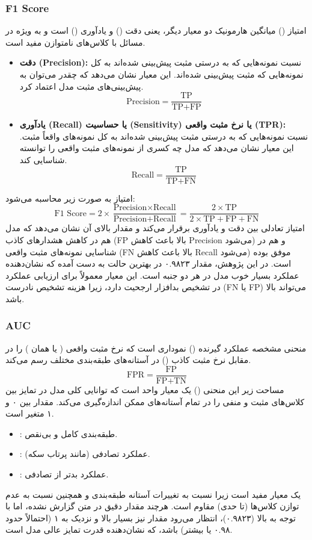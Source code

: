 \subsubsection{F1 Score}
امتیاز  () میانگین هارمونیک دو معیار دیگر، یعنی دقت () و یادآوری () است و به ویژه در مسائل با کلاس‌های نامتوازن مفید است.
\begin{itemize}
    \item \textbf{دقت (Precision):} نسبت نمونه‌هایی که به درستی مثبت پیش‌بینی شده‌اند به کل نمونه‌هایی که مثبت پیش‌بینی شده‌اند. این معیار نشان می‌دهد که چقدر می‌توان به پیش‌بینی‌های مثبت مدل اعتماد کرد.
    \[ \text{Precision} = \frac{\text{TP}}{\text{TP} + \text{FP}} \]
    \item \textbf{یادآوری (Recall) یا حساسیت (Sensitivity) یا نرخ مثبت واقعی (TPR):} نسبت نمونه‌هایی که به درستی مثبت پیش‌بینی شده‌اند به کل نمونه‌های واقعاً مثبت. این معیار نشان می‌دهد که مدل چه کسری از نمونه‌های مثبت واقعی را توانسته شناسایی کند.
    \[ \text{Recall} = \frac{\text{TP}}{\text{TP} + \text{FN}} \]
\end{itemize}
امتیاز  به صورت زیر محاسبه می‌شود:
\[ \text{F1 Score} = 2 \times \frac{\text{Precision} \times \text{Recall}}{\text{Precision} + \text{Recall}} = \frac{2 \times \text{TP}}{2 \times \text{TP} + \text{FP} + \text{FN}} \]
امتیاز  تعادلی بین دقت و یادآوری برقرار می‌کند و مقدار بالای آن نشان می‌دهد که مدل هم در کاهش هشدارهای کاذب (FP بالا باعث کاهش Precision می‌شود) و هم در شناسایی نمونه‌های مثبت واقعی (FN بالا باعث کاهش Recall می‌شود) موفق بوده است. در این پژوهش، مقدار  ۰.۹۸۲۳ در بهترین حالت به دست آمده که نشان‌دهنده عملکرد بسیار خوب مدل در هر دو جنبه است. این معیار معمولاً برای ارزیابی عملکرد در تشخیص بدافزار ارجحیت دارد، زیرا هزینه تشخیص نادرست (FN یا FP) می‌تواند بالا باشد.

\subsubsection{AUC }
منحنی مشخصه عملکرد گیرنده () نموداری است که نرخ مثبت واقعی ( یا همان ) را در مقابل نرخ مثبت کاذب () در آستانه‌های طبقه‌بندی مختلف رسم می‌کند.
\[ \text{FPR} = \frac{\text{FP}}{\text{FP} + \text{TN}} \]
مساحت زیر این منحنی () یک معیار واحد است که توانایی کلی مدل در تمایز بین کلاس‌های مثبت و منفی را در تمام آستانه‌های ممکن اندازه‌گیری می‌کند. مقدار  بین ۰ و ۱ متغیر است.
\begin{itemize}
    \item {}: طبقه‌بندی کامل و بی‌نقص.
    \item {}: عملکرد تصادفی (مانند پرتاب سکه).
    \item {}: عملکرد بدتر از تصادفی.
\end{itemize}
 یک معیار مفید است زیرا نسبت به تغییرات آستانه طبقه‌بندی و همچنین نسبت به عدم توازن کلاس‌ها (تا حدی) مقاوم است. هرچند مقدار دقیق  در متن گزارش نشده، اما با توجه به  بالا (۰.۹۸۲۳)، انتظار می‌رود مقدار  نیز بسیار بالا و نزدیک به ۱ (احتمالاً حدود ۰.۹۸ یا بیشتر) باشد، که نشان‌دهنده قدرت تمایز عالی مدل  است.

